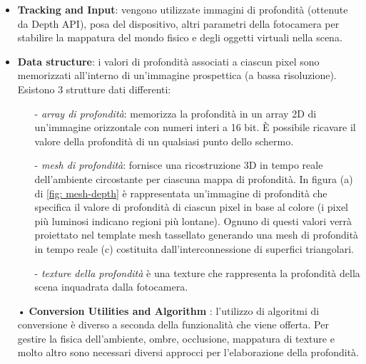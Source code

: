 \documentclass[crop=false, class=book]{standalone}
\begin{document}
		\begin{itemize}
			\item \textbf{Tracking and Input}: vengono utilizzate immagini di profondità (ottenute da Depth API), posa del dispositivo, altri parametri della fotocamera per stabilire la mappatura del mondo fisico e degli oggetti virtuali nella scena.
			\item \textbf{Data structure}: i valori di profondità associati a ciascun pixel sono memorizzati all'interno di un'immagine prospettica (a bassa risoluzione).\\
			Esistono 3 strutture dati differenti:
			\begin{itemize}
				\item[-] \emph{array di profondità}: memorizza la profondità in un array 2D di un'immagine orizzontale con numeri interi a 16 bit. \`E possibile ricavare il valore della profondità di un qualsiasi punto dello schermo.
				\item[-] \emph{mesh di profondità}: fornisce una ricostruzione 3D in tempo reale dell'ambiente circostante per ciascuna mappa di profondità. In figura (a) di \vref{fig: mesh-depth} è rappresentata un'immagine di profondità che specifica il valore di profondità di ciascun pixel in base al colore (i pixel più luminosi indicano regioni più lontane). Ognuno di questi valori verrà proiettato nel template mesh tassellato generando una mesh di profondità in tempo reale (c) costituita dall'interconnessione di superfici triangolari.  
				\item[-] \emph{texture della profondità} è una texture che rappresenta la profondità della scena inquadrata dalla fotocamera.
			\end{itemize}
			\item[•] \textbf{Conversion Utilities and Algorithm }: l'utilizzo di algoritmi di conversione è diverso a seconda della funzionalità che viene offerta. Per gestire la fisica dell'ambiente, ombre, occlusione, mappatura di texture e molto altro sono necessari diversi approcci per l'elaborazione della profondità.
			

\end{itemize}
\end{document}
